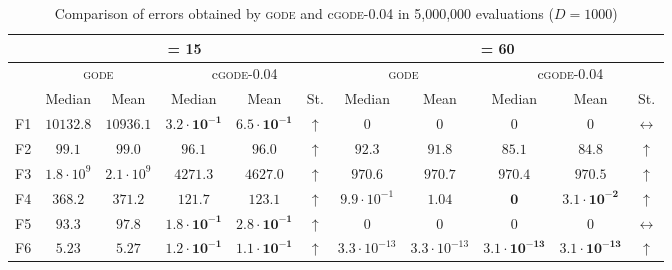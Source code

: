 \begin{table*}[!t]
\caption{Comparison of errors obtained by \textsc{gode} and c\textsc{gode}-0.04 in 5,000,000 evaluations ($D = 1000$)}
\label{tab:gode}
\centering
\begin{scriptsize}
\begin{tabular}{c || c c | c c c || c c | c c c}
\hline
 & \multicolumn{5}{|c||}{\NP{} = 15} & \multicolumn{5}{|c}{\NP{} = 60} \\ \hline
 & \multicolumn{2}{|c|}{\textsc{gode}}      & \multicolumn{3}{|c||}{c\textsc{gode-0.04}}         & \multicolumn{2}{|c|}{\textsc{gode}} & \multicolumn{3}{|c}{c\textsc{gode-0.04}} \\ \hline
    & Median               & Mean               & Median               & Mean                 & St.               & Median               & Mean                 & Median               & Mean                 & St.                \\ \hline
F1  & $10132.8$            & $10936.1$          & $\mathbf{3.2 \cdot 10^{-1}}$  & $\mathbf{6.5 \cdot 10^{-1}}$  & $\uparrow$        & $0$                  & $0$                  & $0$                  & $0$                  & $\leftrightarrow$  \\ \hline
F2  & $99.1$               & $99.0$             & $\mathbf{96.1}$               & $\mathbf{96.0}$               & $\uparrow$        & $92.3$               & $91.8$               & $\mathbf{85.1}$               & $\mathbf{84.8}$               & $\uparrow$         \\ \hline
F3  & $1.8 \cdot 10^{9}$   & $2.1 \cdot 10^{9}$ & $\mathbf{4271.3}$             & $\mathbf{4627.0}$             & $\uparrow$        & $970.6$              & $970.7$              & $\mathbf{970.4}$              & $\mathbf{970.5}$              & $\uparrow$         \\ \hline
F4  & $368.2$              & $371.2$            & $\mathbf{121.7}$              & $\mathbf{123.1}$              & $\uparrow$        & $9.9 \cdot 10^{-1}$  & $1.04$               & $\mathbf{0}$                  & $\mathbf{3.1 \cdot 10^{-2}}$  & $\uparrow$         \\ \hline
F5  & $93.3$               & $97.8$             & $\mathbf{1.8 \cdot 10^{-1}}$  & $\mathbf{2.8 \cdot 10^{-1}}$  & $\uparrow$        & $0$                  & $0$                  & $0$                  & $0$                  & $\leftrightarrow$  \\ \hline
F6  & $5.23$               & $5.27$             & $\mathbf{1.2 \cdot 10^{-1}}$  & $\mathbf{1.1 \cdot 10^{-1}}$  & $\uparrow$        & $3.3 \cdot 10^{-13}$ & $3.3 \cdot 10^{-13}$ & $\mathbf{3.1 \cdot 10^{-13}}$ & $\mathbf{3.1 \cdot 10^{-13}}$ & $\uparrow$         \\ \hline

\end{tabular}
\end{scriptsize}
\end{table*}
